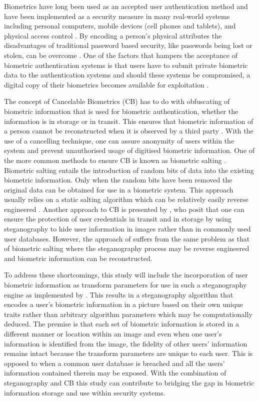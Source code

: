 Biometrics have long been used as an accepted user authentication method and have been implemented as a security measure in many real-world systems including personal computers, mobile devices (cell phones and tablets), and physical access control \citep{Liu2001}. By encoding a person’s physical attributes the disadvantages of traditional password based security, like passwords being lost or stolen, can be overcome \citep{Jain2016}. One of the factors that hampers the acceptance of biometric authentication systems is that users have to submit private biometric data to the authentication systems and should these systems be compromised, a digital copy of their biometrics becomes available for exploitation \citep{Rathgeb2011}.

The concept of Cancelable Biometrics (CB) has to do with obfuscating of biometric information that is used for biometric authentication, whether the information is in storage or in transit. This ensures that biometric information of a person cannot be reconstructed when it is observed by a third party \citep{Shahim2016}. With the use of a cancelling technique, one can assure anonymity of users within the system and prevent unauthorised usage of digitised biometric information. One of the more common methods to ensure CB is known as biometric salting \citep{Rathgeb2011}. Biometric salting entails the introduction of random bits of data into the existing biometric information. Only when the random bits have been removed the original data can be obtained for use in a biometric system. This approach usually relies on a static salting algorithm which can be relatively easily reverse engineered \citep{Shahim2016}. Another approach to CB is presented by \cite{Dlamini2016}, who posit that one can ensure the protection of user credentials in transit and in storage by using steganography to hide user information in images rather than in commonly used user databases. However, the approach of \cite{Dlamini2016} suffers from the same problem as that of biometric salting where the steganography process may be reverse engineered and biometric information can be reconstructed. 

To address these shortcomings, this study will include the incorporation of user biometric information as transform parameters for use in such a steganography engine as implemented by \cite{Dlamini2016}. This results in a steganography algorithm that encodes a user’s biometric information in a picture based on their own unique traits rather than arbitrary algorithm parameters which may be computationally deduced. The premise is that each set of biometric information is stored in a different manner or location within an image and even when one user’s information is identified from the image, the fidelity of other users’ information remains intact because the transform parameters are unique to each user. This is opposed to when a common user database is breached and all the users’ information contained therein may be exposed. With the combination of steganography and CB this study can contribute to bridging the gap in biometric information storage and use within security systems.

